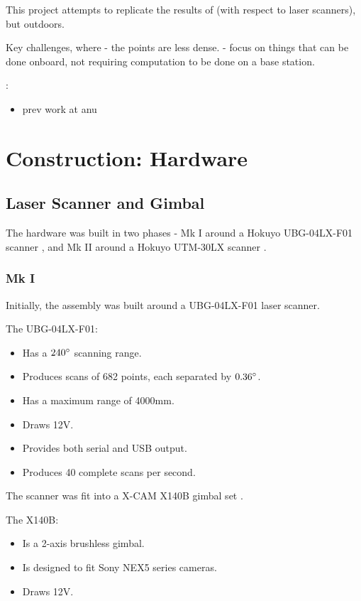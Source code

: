 \documentclass[12pt,oneside,a4paper]{book}
\begin{document}
This project attempts to replicate the results of
\cite{achtelik2009stereo} (with respect to laser scanners), but
outdoors. 

Key challenges, where
 - the points are less dense.
 - focus on things that can be done onboard, not requiring computation
 to be done on a base station.


\cite{robust}:
\begin{itemize}
\item prev work at anu
\end{itemize}



\chapter{Construction: Hardware}
\label{sec:hardware}

\section{Laser Scanner and Gimbal}
\label{sec:laser-scanner-gimbal}

The hardware was built in two phases - Mk I around a Hokuyo
UBG-04LX-F01 scanner \cite{scanner1}, and Mk II around a Hokuyo UTM-30LX scanner \cite{scanner2}. 

\subsection{Mk I}
\label{sec:mk-i}

Initially, the assembly was built around a UBG-04LX-F01 laser
scanner.

The UBG-04LX-F01:
\begin{itemize}
\item Has a $240\degree$ scanning range.
\item Produces scans of 682 points, each separated by $0.36\degree$.
\item Has a maximum range of 4000mm.
\item Draws 12V.
\item Provides both serial and USB output.
\item Produces 40 complete scans per second.
\end{itemize}

The scanner was fit into a X-CAM X140B gimbal set \cite{gimbal}. 

The X140B:
\begin{itemize}
\item Is a 2-axis brushless gimbal.
\item Is designed to fit Sony NEX5 series cameras.
\item Draws 12V.
\end{itemize}
\end{document}
